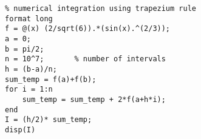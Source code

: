 \lstset{basicstyle=\footnotesize,style=myCustomMatlabStyle}
\begin{lstlisting}
% numerical integration using trapezium rule
format long
f = @(x) (2/sqrt(6)).*(sin(x).^(2/3));
a = 0;
b = pi/2;
n = 10^7;       % number of intervals
h = (b-a)/n;
sum_temp = f(a)+f(b);
for i = 1:n
    sum_temp = sum_temp + 2*f(a+h*i);
end
I = (h/2)* sum_temp;
disp(I)
\end{lstlisting}
